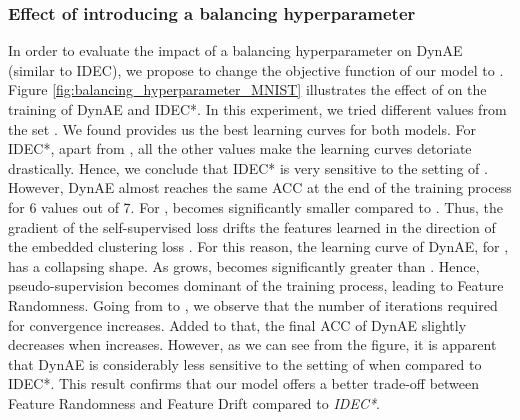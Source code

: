 \documentclass{article}
\begin{document}
\begin{figure*}[ht]
\vskip 0.2in
\centering
    \caption{ values during training on MNIST.}
\label{fig:Delta_FD_MNIST}
\end{figure*}







\subsubsection{Effect of introducing a balancing hyperparameter}
\label{Sec:Balancing hyperparameter}
In order to evaluate the impact of a balancing hyperparameter  on DynAE (similar to IDEC), we propose to change the objective function of our model to . Figure \ref{fig:balancing_hyperparameter_MNIST} illustrates the effect of  on the training of DynAE and IDEC*. In this experiment, we tried different  values from the set . We found  provides us the best learning curves for both models. For IDEC*, apart from  , all the other values make the learning curves detoriate drastically. Hence, we conclude that IDEC* is very sensitive to the setting of . However, DynAE almost reaches the same ACC at the end of the training process for 6  values out of 7.
For ,  becomes significantly smaller compared to . Thus, the gradient of the self-supervised loss  drifts the features learned in the direction of the embedded clustering loss . For this reason, the learning curve of DynAE, for , has a collapsing shape. As  grows,  becomes significantly greater than . Hence, pseudo-supervision becomes dominant of the training process, leading to Feature Randomness. Going from  to , we observe that the number of iterations required for convergence increases. Added to that, the final ACC of DynAE slightly decreases when  increases. However, as we can see from the figure, it is apparent that DynAE is considerably less sensitive to the setting of  when compared to IDEC*. This result confirms that our model offers a better trade-off between Feature Randomness and Feature Drift compared to \textit{IDEC*}.
 
\begin{figure*}[ht]
\vskip 0.2in
\centering
    \caption{Effect of the balancing hyperparameter during training on MNIST.}
\label{fig:balancing_hyperparameter_MNIST}
\end{figure*}
\end{document}
